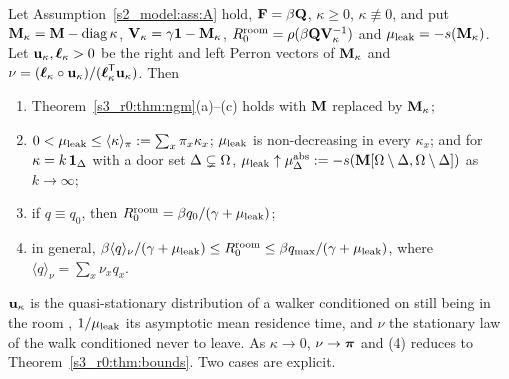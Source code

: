 \begin{theorem}\label{s4_geometry:thm:leaky}
  Let Assumption~\ref{s2_model:ass:A} hold, $\mathbf{F}=\beta\mathbf{Q}$, $\kappa\ge0$, $\kappa\not\equiv0$, and put
  $\mathbf{M}_{\kappa}=\mathbf{M}-\operatorname{diag}\kappa$, $\mathbf{V}_\kappa=\gamma\mathbf{1}-\mathbf{M}_{\kappa}$, $R_0^{\mathrm{room}}=\rho(\beta\mathbf{Q}\mathbf{V}_\kappa^{-1})$ and
  $\mu_{\mathrm{leak}}=-s(\mathbf{M}_{\kappa})$. Let $\mathbf{u}_\kappa,\boldsymbol{\ell}_\kappa>0$ be the right and left Perron vectors of $\mathbf{M}_{\kappa}$ and
  $\nu=(\boldsymbol{\ell}_\kappa\circ\mathbf{u}_\kappa)/(\boldsymbol{\ell}_\kappa^{\mathsf{T}}\mathbf{u}_\kappa)$. Then
  \begin{enumerate}
    \item[(1)] Theorem~\ref{s3_r0:thm:ngm}(a)--(c) holds with $\mathbf{M}$ replaced by $\mathbf{M}_{\kappa}$;
    \item[(2)] $0<\mu_{\mathrm{leak}}\le\langle\kappa\rangle_\pi:=\sum_x\pi_x\kappa_x$; $\mu_{\mathrm{leak}}$ is non-decreasing in every
       $\kappa_x$; and for
       $\kappa=k\,\boldsymbol{1}_\Delta$ with a door set $\Delta\subsetneq\Omega$,
       $\mu_{\mathrm{leak}}\uparrow\mu^{\mathrm{abs}}_\Delta:=-s(\mathbf{M}[\Omega\setminus\Delta,\Omega\setminus\Delta])$ as $k\to\infty$;
    \item[(3)] if $q\equiv q_0$, then $R_0^{\mathrm{room}}=\beta q_0/(\gamma+\mu_{\mathrm{leak}})$;
    \item[(4)] in general, $\beta\langle q\rangle_\nu/(\gamma+\mu_{\mathrm{leak}})\le R_0^{\mathrm{room}}\le\beta q_{\max}/(\gamma+\mu_{\mathrm{leak}})$, where
       $\langle q\rangle_\nu=\sum_x\nu_xq_x$.
  \end{enumerate}
\end{theorem}

$\mathbf{u}_\kappa$ is the quasi-stationary distribution of a walker conditioned on still being in the room
\citep{darroch1967quasi}, $1/\mu_{\mathrm{leak}}$ its asymptotic mean residence time, and $\nu$ the stationary law of the
walk conditioned never to leave. As $\kappa\to0$, $\nu\to\boldsymbol{\pi}$ and (4) reduces to
Theorem~\ref{s3_r0:thm:bounds}. Two cases are explicit.

